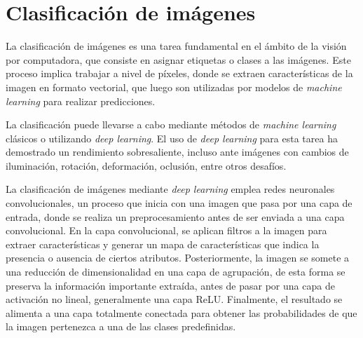 \section{Clasificación de imágenes}

La clasificación de imágenes es una tarea fundamental en el ámbito de la visión por computadora, que consiste en asignar etiquetas o clases a las imágenes. Este proceso implica trabajar a nivel de píxeles, donde se extraen características de la imagen en formato vectorial, que luego son utilizadas por modelos de \textit{machine learning} para realizar predicciones. 

La clasificación puede llevarse a cabo mediante métodos de \textit{machine learning} clásicos o utilizando \textit{deep learning}. El uso de \textit{deep learning} para esta tarea ha demostrado un rendimiento sobresaliente, incluso ante imágenes con cambios de iluminación, rotación, deformación, oclusión, entre otros desafíos.

La clasificación de imágenes mediante \textit{deep learning} emplea redes neuronales convolucionales, un proceso que inicia con una imagen que pasa por una capa de entrada, donde se realiza un preprocesamiento antes de ser enviada a una capa convolucional. En la capa convolucional, se aplican filtros a la imagen para extraer características y generar un mapa de características que indica la presencia o ausencia de ciertos atributos. Posteriormente, la imagen se somete a una reducción de dimensionalidad en una capa de agrupación, de esta forma se preserva la información importante extraída, antes de pasar por una capa de activación no lineal, generalmente una capa ReLU. Finalmente, el resultado se alimenta a una capa totalmente conectada para obtener las probabilidades de que la imagen pertenezca a una de las clases predefinidas. 



